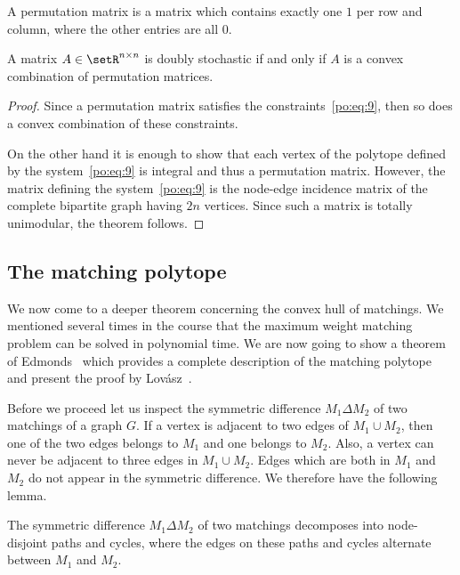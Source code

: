 A permutation matrix is a matrix which contains exactly one $1$ per
row and column, where the other entries are all $0$. 

\begin{theorem}
  \label{po:thr:17}
  A matrix $A \in \setR^{n\times n}$ is doubly stochastic if and only if $A$ is
  a  convex combination  of permutation matrices. 
\end{theorem}

\begin{proof}
  Since a permutation matrix satisfies the constraints~\eqref{po:eq:9},
  then so does a convex combination of these constraints. 


  On the other hand it is enough to show that each vertex of the
  polytope defined by the system~\eqref{po:eq:9} is integral and thus a
  permutation matrix. However, the matrix defining the
  system~\eqref{po:eq:9}  is the node-edge incidence matrix of the
  complete bipartite graph having $2n$ vertices. Since such a matrix
  is totally unimodular, the theorem follows. 
\end{proof}





\subsection{The matching polytope}
\label{po:sec:matching-polytope}


We now come to a deeper theorem concerning the convex hull of
matchings. We mentioned several times in the course that the maximum
weight matching problem can be solved in polynomial time. We are now
going to show a theorem of Edmonds~\cite{Edmonds65b} which provides a
complete description of the matching polytope and present the
proof by Lov\'asz~\cite{Lovasz79}. 

Before we proceed let us inspect the symmetric difference $M_1\Delta M_2$
of two matchings of a graph $G$. If a vertex is adjacent to two edges
of $M_1\cup M_2$, then one of the two edges belongs to
$M_1$ and one belongs to $M_2$. Also, a vertex can never be adjacent
to three edges in $M_1 \cup M_2$. Edges which are both in $M_1$ and $M_2$
do not appear in the symmetric difference. We therefore have the
following lemma. 

\begin{lemma}
  \label{po:lem:11}
  The symmetric difference $M_1\Delta M_2$ of two matchings decomposes
  into node-disjoint  paths and cycles, where the edges on these paths
  and cycles alternate between $M_1$ and $M_2$. 
\end{lemma}



